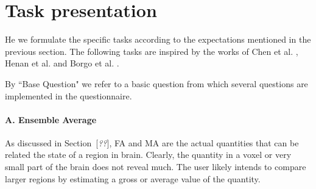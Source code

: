 \documentclass[hyperref, plainreport, noproblem]{cgvpub1}
\newcommand{\comment}[1]{{\color{red}[\textit{#1}]}}
\begin{document}
\section{Task presentation}
He we formulate the specific tasks according to the expectations mentioned in the previous section. The following tasks are inspired by the works of Chen et al. \cite{chen}, Henan et al. \cite{henan} and Borgo et al. \cite{borgo}.

By ``Base Question" we refer to a basic question from which several questions are implemented in the questionnaire.

\paragraph{A. Ensemble Average}

As discussed in Section~\comment{??}, FA and MA are the actual quantities that can be related the state of a region in brain. Clearly, the quantity in a voxel or very small part of the brain does not reveal much. The user likely intends to compare larger regions by estimating a gross or average value of the quantity.
\end{document}
